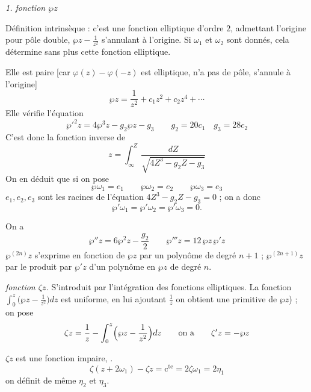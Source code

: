 \documentclass[11pt,a4paper]{article}
\begin{document}
\emph{1. fonction $\wp z$}

Définition intrinsèque : c'est une fonction elliptique d'ordre $2$, admettant
l'origine pour pôle double,  
$\wp z - \frac{1}{z^2}$ s'annulant à l'origine. Si $\omega_1$ et $\omega_2$ sont
donnés, cela détermine sans plus cette fonction elliptique.

Elle est paire [car $\varphi(z)-\varphi(-z)$ est elliptique, n'a pas de pôle,
s'annule à l'origine]  
\[
\wp z = \frac{1}{z^2} + c_1 z^2 + c_2 z^4 + \cdots
\]
Elle vérifie l'équation
\[
\wp'^2 z = 4\wp^3 z - g_2\wp z - g_3 \qquad g_2 = 20c_1 \quad g_3 = 28 c_2
\]
C'est donc la fonction inverse de
\[
z = \int_\infty^{Z} \frac{dZ}{\sqrt{4Z^3 - g_2 Z - g_3}}
\]
On en déduit que si on pose
\[
\wp\omega_1 = e_1 \qquad \wp\omega_2 = e_2 \qquad \wp\omega_3 = e_3
\]
$e_1, e_2, e_3$ sont les racines de l'équation $4Z^3 - g_2Z - g_3 = 0$ ; on a
donc
\[
\wp'\omega_1 = \wp'\omega_2 = \wp'\omega_3 = 0 .
\]

On a
\[
\wp'' z = 6\wp^2 z - \frac{g_2}{2} \qquad \wp''' z = 12\,\wp z\,\wp' z
\]
$\wp^{(2n)}z$ s'exprime en fonction de $\wp z$ par un polynôme de degré $n+1$ ;
$\wp^{(2n+1)}z$ par le produit par $\wp' z$ d'un polynôme en $\wp z$ de degré $n$.

\emph{ fonction $\zeta z$.}
S'introduit par l'intégration des fonctions elliptiques. La fonction
$\int_0^z \bigl(\wp z - \frac{1}{z^2}\bigr)dz$ est uniforme, en lui ajoutant
$\frac{1}{z}$ on obtient une primitive de $\wp z$) ; on pose
\[
\zeta z = \frac{1}{z} - \int_0^z \Bigl(\wp z - \frac{1}{z^2}\Bigr)dz
\qquad \text{on a} \qquad \zeta' z = -\wp z
\]

$\zeta z$ est une fonction impaire, 
.
\[
\zeta(z+2\omega_1) - \zeta z = \text{c}^{\text{te}} = 2\zeta\omega_1 = 2\eta_1
\]
on définit de même $\eta_2$ et $\eta_3$.
\end{document}
